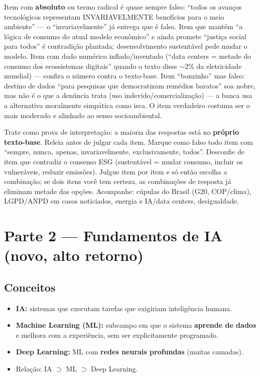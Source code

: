 \begin{pegadinha}
Item com \textbf{absoluto} ou termo radical é quase sempre falso: ``todos os
avanços tecnológicos representam INVARIAVELMENTE benefícios para o meio
ambiente'' --- o ``invariavelmente'' já entrega que é falso. Item que mantém
``a lógica de consumo do atual modelo econômico'' e ainda promete ``justiça
social para todos'' é contradição plantada; desenvolvimento sustentável pede
mudar o modelo. Item com dado numérico inflado/inventado (``data centers =
metade do consumo dos ecossistemas digitais'' quando o texto disse
${\sim}$2\% da eletricidade mundial) --- confira o número contra o
texto-base. Item ``bonzinho'' mas falso: destino de dados ``para pesquisas
que democratizam remédios baratos'' soa nobre, mas não é o que a denúncia
trata (uso indevido/comercialização) --- a banca usa a alternativa
moralmente simpática como isca. O item verdadeiro costuma ser o mais
moderado e alinhado ao senso socioambiental.
\end{pegadinha}

\begin{comosair}
Trate como prova de interpretação: a maioria das respostas está no
\textbf{próprio texto-base}. Releia antes de julgar cada item. Marque como
falso todo item com ``sempre, nunca, apenas, invariavelmente,
exclusivamente, todos''. Desconfie de item que contradiz o consenso ESG
(sustentável = mudar consumo, incluir os vulneráveis, reduzir emissões).
Julgue item por item e só então escolha a combinação; se dois itens você tem
certeza, as combinações de resposta já eliminam metade das opções. Acompanhe:
cúpulas do Brasil (G20, COP/clima), LGPD/ANPD em casos noticiados, energia e
IA/data centers, desigualdade.
\end{comosair}

\section{Parte 2 --- Fundamentos de IA (novo, alto retorno)}

\subsection{Conceitos}

\begin{itemize}
\item \textbf{IA:} sistemas que executam tarefas que exigiriam inteligência
humana.
\item \textbf{Machine Learning (ML):} subcampo em que o sistema
\textbf{aprende de dados} e melhora com a experiência, sem ser
explicitamente programado.
\item \textbf{Deep Learning:} ML com \textbf{redes neurais profundas}
(muitas camadas).
\item Relação: IA $\supset$ ML $\supset$ Deep Learning.
\end{itemize}

